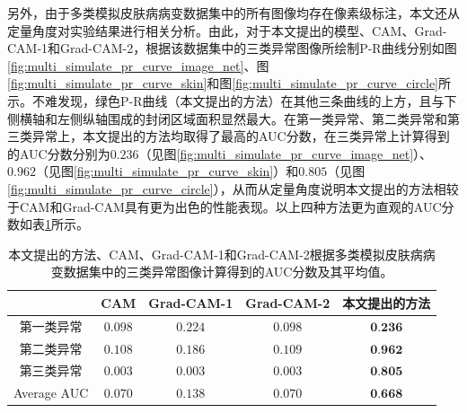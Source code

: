 另外，由于多类模拟皮肤病病变数据集中的所有图像均存在像素级标注，本文还从定量角度对实验结果进行相关分析。由此，对于本文提出的模型、CAM、Grad-CAM-1和Grad-CAM-2，根据该数据集中的三类异常图像所绘制P-R曲线分别如图\ref{fig:multi_simulate_pr_curve_image_net}、图\ref{fig:multi_simulate_pr_curve_skin}和图\ref{fig:multi_simulate_pr_curve_circle}所示。不难发现，绿色P-R曲线（本文提出的方法）在其他三条曲线的上方，且与下侧横轴和左侧纵轴围成的封闭区域面积显然最大。在第一类异常、第二类异常和第三类异常上，本文提出的方法均取得了最高的AUC分数，在三类异常上计算得到的AUC分数分别为$0.236$（见图\ref{fig:multi_simulate_pr_curve_image_net}）、$0.962$（见图\ref{fig:multi_simulate_pr_curve_skin}）和$0.805$（见图\ref{fig:multi_simulate_pr_curve_circle}），从而从定量角度说明本文提出的方法相较于CAM和Grad-CAM具有更为出色的性能表现。以上四种方法更为直观的AUC分数如表\ref{tab:multi_ds_auc_scores}所示。

\begin{table}[!htbp]
	\centering
	\caption{本文提出的方法、CAM、Grad-CAM-1和Grad-CAM-2根据多类模拟皮肤病病变数据集中的三类异常图像计算得到的AUC分数及其平均值。}
	\label{tab:multi_ds_auc_scores}
	\begin{tabular}{c|c|c|c|c}
		\toprule[2pt]
		& CAM & Grad-CAM-1 & Grad-CAM-2 & 本文提出的方法 \\
		\midrule[2pt]
		第一类异常&$0.098$ & $0.224$ &  $0.098$ & $\textbf{0.236}$ \\ \hline
		第二类异常&  $0.108$ &$0.186$ & $0.109$ & $\textbf{0.962}$ \\ \hline
		第三类异常 & $0.003$ & $0.003$ & $0.003$ & $\textbf{0.805}$ \\ \hline
		Average AUC & $0.070$ & $0.138$ & $0.070$ & $\textbf{0.668}$ \\
		\bottomrule[2pt]
	\end{tabular}
\end{table}

